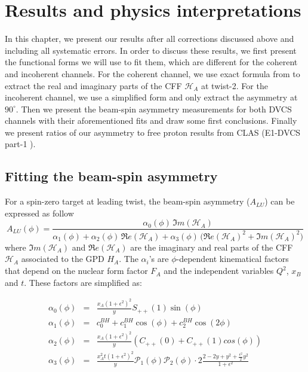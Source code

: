 \chapter{Results and physics interpretations}
In this chapter, we present our results after all corrections discussed above and including
all systematic errors. In order to discuss these results, we first present the functional forms
we will use to fit them, which are different for the coherent and incoherent 
channels. For the coherent channel, we use exact formula from \cite{FX_BSA} to 
extract the real and imaginary parts
of the CFF $\mathcal{H}_{A}$ at twist-2. For the incoherent channel, we use a simplified form 
and only extract the asymmetry at $90^{\circ}$. Then we present the beam-spin asymmetry 
measurements for both DVCS channels with their aforementioned fits and draw some first 
conclusions. Finally we present ratios of our asymmetry to free proton results 
from CLAS (E1-DVCS part-1 \cite{FX_BSA, FX_analysis_note}).

\section{Fitting the beam-spin asymmetry} \label{Beam-Spin}
For a spin-zero target at leading twist, the beam-spin asymmetry ($A_{LU}$) 
can be expressed as follow \cite{BM_2009}
\begin{equation}
A_{LU}(\phi) = \frac{\alpha_{0}(\phi) \, \Im m(\mathcal{H}_{A})}
{\alpha_{1}(\phi) + \alpha_{2}(\phi) \, \Re e(\mathcal{H}_{A}) + \alpha_{3}(\phi) \, 
\big( 
\Re e(\mathcal{H}_{A})^{2} + \Im m(\mathcal{H}_{A})^{2} \big)}
\label{eq:A_LU-coh}
\end{equation}
where $\Im m(\mathcal{H}_{A})$ and $\Re e(\mathcal{H}_{A})$ are the imaginary 
and real parts of the CFF $\mathcal{H}_{A}$ associated to the GPD $H_A$. The 
$\alpha_{i}$'s are $\phi$-dependent kinematical factors that depend on the 
nuclear form factor $F_A$ and the independent variables $Q^2$, $x_{B}$ and $t$.  
These factors are simplified as:

\small
\begin{eqnarray}
   \alpha_0 (\phi) & = &\frac{x_{A}(1+\epsilon^2)^2}{y} S_{++}(1) \sin(\phi)\\
    \alpha_1 (\phi) & = & c_0^{BH}+c_1^{BH} \cos({\phi})+c_2^{BH} \cos(2\phi)\\ 
   \alpha_2 (\phi) & = & \frac{x_{A}(1+\epsilon^2)^2}{y}  \left( C_{++}(0) +  
C_{++}(1) cos(\phi) \right)\\
\alpha_3 (\phi) &=& \frac{x^{2}_{A}t(1+\epsilon^2)^2}{y} {\mathcal P}_1(\phi) 
{\mathcal P}_2(\phi) \cdot 2 \frac{2-2y+y^2 + \frac{\epsilon^2}{2}y^2}{1 + 
\epsilon^2}
\end{eqnarray}
\normalsize

